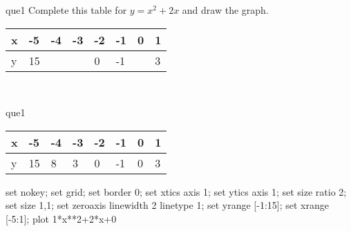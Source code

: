 \documentclass[13.5pt, varwidth=true]{beamer}
\begin{document}
\begin{frame}[shrink=19,fragile]
	\begin{beamercolorbox}[rounded=true, left, shadow=true,wd=14.8cm]{que1}
		 Complete this table for $y = x^{2} + 2x$ and draw the graph. \\[0.3cm] \renewcommand{\arraystretch}{1.2}\begin{tabular}{|C|C|C|C|C|C|C|C|} \hline x & -5 & -4 & -3 & -2 & -1 & 0 & 1 \\ \hline y & 15 &  &  & 0 & -1 &  & 3\\ \hline \end{tabular}\\[0.3cm]
	\end{beamercolorbox}
\end{frame}
\begin{frame}[shrink=19,fragile]
	\begin{beamercolorbox}[rounded=true, left, shadow=true,wd=14.8cm]{que1}
		\renewcommand{\arraystretch}{1.2}\begin{tabular}{|C|C|C|C|C|C|C|C|} \hline x & -5 & -4 & -3 & -2 & -1 & 0 & 1 \\ \hline y & 15 & 8 & 3 & 0 & -1 & 0 & 3\\ \hline \end{tabular}\begin{gnuplot}[terminal=pdf] set nokey; set grid; set border 0; set xtics axis 1; set ytics axis 1; set size ratio 2; set size 1,1; set zeroaxis linewidth 2 linetype 1; set yrange [-1:15]; set xrange [-5:1]; plot 1*x**2+2*x+0 \end{gnuplot}
	\end{beamercolorbox}
\end{frame}
\end{document}
